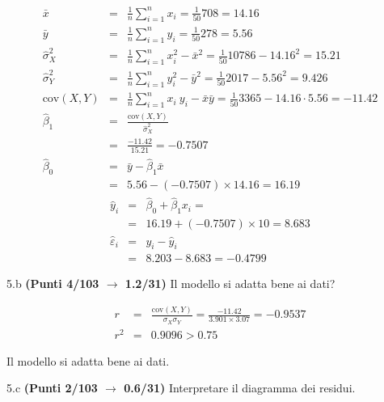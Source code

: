 \documentclass[
  11pt,
]{book}
\theoremstyle{mytheoremstyle}
\theoremstyle{mydefstyle}
\newenvironment{sol}
  {
  \begin{tcolorbox}[enhanced,breakable,arc=0.1mm,boxrule=1pt,colback=white,colframe=iblue,
  title=\bf \fontfamily{lmss}\selectfont \hspace{.5 cm} Soluzione,drop fuzzy shadow]

}{
\end{tcolorbox}
  }
\begin{document}
\begin{sol}
\begin{eqnarray*}
           \bar x &=&\frac 1 n\sum_{i=1}^n x_i = \frac {1}{ 50 }  708 =  14.16 \\
           \bar y &=&\frac 1 n\sum_{i=1}^n y_i = \frac {1}{ 50 }  278 =  5.56 \\
           \hat\sigma_X^2&=&\frac 1 n\sum_{i=1}^n x_i^2-\bar x^2=\frac {1}{ 50 }  10786  - 14.16 ^2= 15.21 \\
           \hat\sigma_Y^2&=&\frac 1 n\sum_{i=1}^n y_i^2-\bar y^2=\frac {1}{ 50 }  2017  - 5.56 ^2= 9.426 \\
           \text{cov}(X,Y)&=&\frac 1 n\sum_{i=1}^n x_i~y_i-\bar x\bar y=\frac {1}{ 50 }  3365 - 14.16 \cdot 5.56 = -11.42 \\
           \hat\beta_1 &=& \frac{\text{cov}(X,Y)}{\hat\sigma_X^2} \\
                    &=& \frac{ -11.42 }{ 15.21 }  =  -0.7507 \\
           \hat\beta_0 &=& \bar y - \hat\beta_1 \bar x\\
                    &=&  5.56 - (-0.7507) \times  14.16 = 16.19 
         \end{eqnarray*}\begin{eqnarray*}
\hat y_i &=&\hat\beta_0+\hat\beta_1 x_i=\\ 
&=& 16.19 + (-0.7507) \times 10 = 8.683 \\ 
\hat \varepsilon_i &=& y_i-\hat y_i\\ 
&=& 8.203 - 8.683 = -0.4799  
\end{eqnarray*}

\end{sol}

5.b \textbf{(Punti 4/103 \(\rightarrow\) 1.2/31)} Il modello si adatta bene ai dati?

\begin{sol}
\begin{eqnarray*}
r&=&\frac{\text{cov}(X,Y)}{\sigma_X\sigma_Y}=\frac{ -11.42 }{ 3.901 \times 3.07 }= -0.9537 \\ 
r^2&=& 0.9096 > 0.75
\end{eqnarray*}

Il modello si adatta bene ai dati.

\end{sol}

5.c \textbf{(Punti 2/103 \(\rightarrow\) 0.6/31)} Interpretare il diagramma dei residui.
\end{document}
